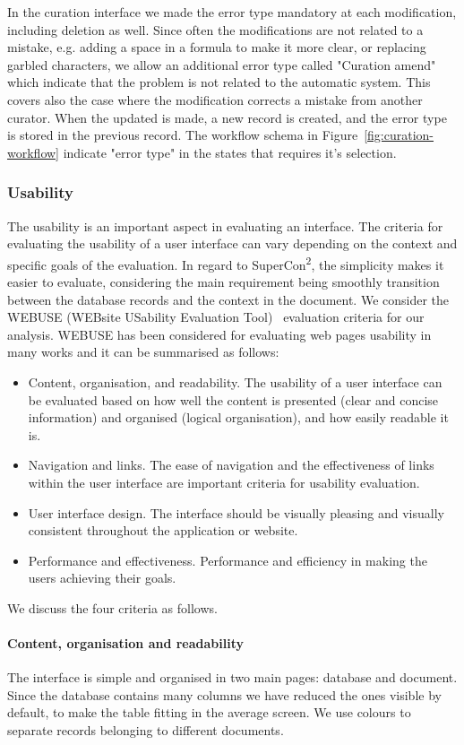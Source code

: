 \documentclass[a4paper]{article}
\begin{document}
In the curation interface we made the error type mandatory at each modification, including deletion as well. Since often the modifications are not related to a mistake, e.g. adding a space in a formula to make it more clear, or replacing garbled characters, we allow an additional error type called "Curation amend" which indicate that the problem is not related to the automatic system. This covers also the case where the modification corrects a mistake from another curator. 
When the updated is made, a new record is created, and the error type is stored in the previous record. The workflow schema in Figure~\ref{fig:curation-workflow} indicate "error type" in the states that requires it's selection. 

\subsubsection{Usability}
The usability is an important aspect in evaluating an interface. 
The criteria for evaluating the usability of a user interface can vary depending on the context and specific goals of the evaluation. 
In regard to SuperCon\textsuperscript{2}, the simplicity makes it easier to evaluate, considering the main requirement being smoothly transition between the database records and the context in the document. 
We consider the WEBUSE (WEBsite USability Evaluation Tool)~\cite{chiew2003webuse} evaluation criteria for our analysis. WEBUSE has been considered for evaluating web pages usability in many works and it can be summarised as follows: 
\begin{itemize}
    \item Content, organisation, and readability. The usability of a user interface can be evaluated based on how well the content is presented (clear and concise information) and organised (logical organisation), and how easily readable it is. 
    \item Navigation and links. The ease of navigation and the effectiveness of links within the user interface are important criteria for usability evaluation. 
    \item User interface design. The interface should be visually pleasing and visually consistent throughout the application or website. 
    \item Performance and effectiveness. Performance and efficiency in making the users achieving their goals.
\end{itemize}

We discuss the four criteria as follows. 
\paragraph{Content, organisation and readability} The interface is simple and organised in two main pages: database and document. Since the database contains many columns we have reduced the ones visible by default, to make the table fitting in the average screen. We use colours to separate records belonging to different documents. 
\end{document}
